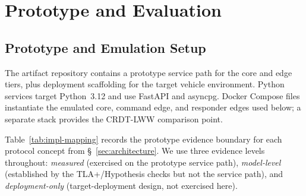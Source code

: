 \section{Prototype and Evaluation}
\label{sec:implementation}

\subsection{Prototype and Emulation Setup}
\label{sec:eval-env}
\label{sec:validation}
\label{sec:evaluation}

The artifact repository contains a prototype service path for the core and edge
tiers, plus deployment scaffolding for the target vehicle environment. Python
services target Python~3.12 and use FastAPI and asyncpg. Docker Compose files
instantiate the emulated core, command edge, and responder edges used below; a
separate  stack provides the CRDT-LWW comparison point.

Table~\ref{tab:impl-mapping} records the prototype evidence boundary for each
protocol concept from \S~\ref{sec:architecture}. We use three evidence levels
throughout: \emph{measured} (exercised on
the prototype service path), \emph{model-level} (established by the TLA+/Hypothesis
checks but not the service path), and \emph{deployment-only} (target-deployment
design, not exercised here).

